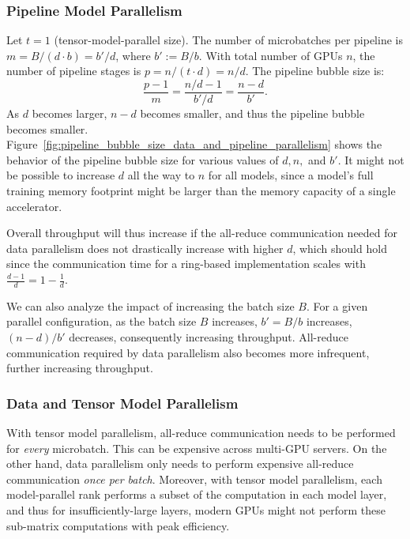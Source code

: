 \subsubsection{Pipeline Model Parallelism} Let $t=1$ (tensor-model-parallel size). The number of microbatches per pipeline is $m = B / (d \cdot b)=b'/d$, where $b':=B/b$. With total number of GPUs $n$, the number of pipeline stages is $p=n/(t\cdot d)=n/d$. The pipeline bubble size is:$$\frac{p-1}{m} = \dfrac{n/d-1}{b'/d} = \dfrac{n-d}{b'}.$$
As $d$ becomes larger, $n-d$ becomes smaller, and thus the pipeline bubble becomes smaller. Figure~\ref{fig:pipeline_bubble_size_data_and_pipeline_parallelism} shows the behavior of the pipeline bubble size for various values of $d, n,$ and $b'$. It might not be possible to increase $d$ all the way to $n$ for all models, since a model's full training memory footprint might be larger than the memory capacity of a single accelerator.

Overall throughput will thus increase if the all-reduce communication needed for data parallelism does not drastically increase with higher $d$, which should hold since the communication time for a ring-based implementation scales with $\frac{d-1}{d} = 1 - \frac{1}{d}$.

We can also analyze the impact of increasing the batch size $B$. For a given parallel configuration, as the batch size $B$ increases, $b'=B/b$ increases, $(n-d)/b'$ decreases, consequently increasing throughput. All-reduce communication required by data parallelism also becomes more infrequent, further increasing throughput.

\subsubsection{Data and Tensor Model Parallelism}
With tensor model parallelism, all-reduce communication needs to be performed for \emph{every} microbatch. This can be expensive across multi-GPU servers. On the other hand, data parallelism only needs to perform expensive all-reduce communication \emph{once per batch}. Moreover, with tensor model parallelism, each model-parallel rank performs a subset of the computation in each model layer, and thus for insufficiently-large layers, modern GPUs might not perform these sub-matrix computations with peak efficiency.

\vspace{0.1in}

\noindent{}

